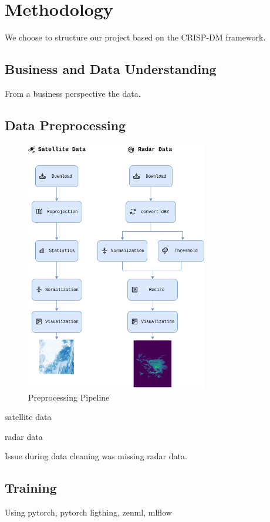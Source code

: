 \documentclass[acmtog, authorversion]{acmart}
\begin{document}
\section{Methodology}
We choose to structure our project based on the CRISP-DM framework.

\subsection{Business and Data Understanding}
From a business perspective the data.

\subsection{Data Preprocessing}

\begin{figure}
  \centering
  \includegraphics[width=225pt]{./images/preprocessing.png}
  \caption{Preprocessing Pipeline}
  \label{fig:preprocessing}
\end{figure}

satellite data

radar data

Issue during data cleaning was missing radar data.

\subsection{Training}
Using pytorch, pytorch ligthing, zenml, mlflow
\end{document}
